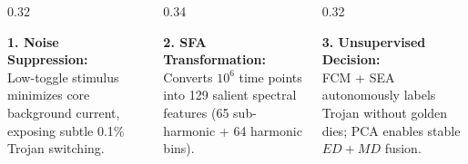 \documentclass[aspectratio=169,11pt]{beamer}
\begin{document}
\begin{frame}[t]
  \vspace{0.04cm}
  \begin{columns}[T, onlytextwidth]
    \begin{column}{0.32\textwidth}
      \begin{glasscard}[top=2pt, bottom=2pt, left=4pt, right=4pt]
        \textbf{\color{textPrimary}1. Noise Suppression:}\\
        Low-toggle stimulus minimizes core background current, exposing subtle 0.1\% Trojan switching.
      \end{glasscard}
    \end{column}
    \begin{column}{0.34\textwidth}
      \begin{glasscard}[top=2pt, bottom=2pt, left=4pt, right=4pt]
        \textbf{\color{textPrimary}2. SFA Transformation:}\\
        Converts $10^6$ time points into 129 salient spectral features (65 sub-harmonic + 64 harmonic bins).
      \end{glasscard}
    \end{column}
    \begin{column}{0.32\textwidth}
      \begin{glasscard}[top=2pt, bottom=2pt, left=4pt, right=4pt]
        \textbf{\color{textPrimary}3. Unsupervised Decision:}\\
        FCM + SEA autonomously labels Trojan without golden dies; PCA enables stable $ED+MD$ fusion.
      \end{glasscard}
    \end{column}
  \end{columns}
\end{frame}
\end{document}
